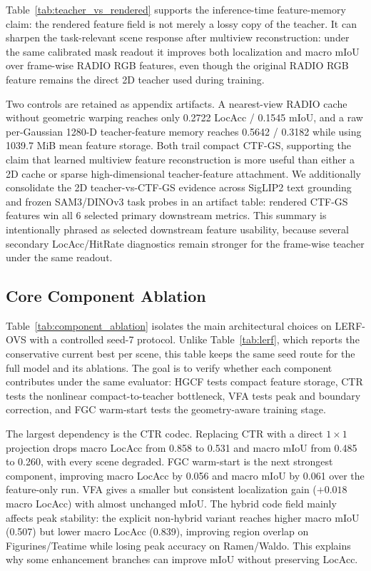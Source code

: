 \documentclass[10pt,twocolumn,letterpaper]{article}
\newcommand{\method}{CTF-GS}
\begin{document}
Table~\ref{tab:teacher_vs_rendered} supports the inference-time feature-memory
claim: the rendered feature field is not merely a lossy copy of the teacher. It
can sharpen the task-relevant scene response after multiview reconstruction:
under the same calibrated mask readout it improves both localization and macro
mIoU over frame-wise RADIO RGB features, even though the original RADIO RGB
feature remains the direct 2D teacher used during training.

Two controls are retained as appendix artifacts. A nearest-view RADIO cache
without geometric warping reaches only 0.2722 LocAcc / 0.1545 mIoU, and a raw
per-Gaussian 1280-D teacher-feature memory reaches 0.5642 / 0.3182 while using
1039.7 MiB mean feature storage. Both trail compact \method{}, supporting the
claim that learned multiview feature reconstruction is more useful than either
a 2D cache or sparse high-dimensional teacher-feature attachment.
We additionally consolidate the 2D teacher-vs-\method{} evidence across
SigLIP2 text grounding and frozen SAM3/DINOv3 task probes in an artifact table:
rendered \method{} features win all 6 selected primary downstream metrics.
This summary is intentionally phrased as selected downstream feature usability,
because several secondary LocAcc/HitRate diagnostics remain stronger for the
frame-wise teacher under the same readout.

\subsection{Core Component Ablation}





Table~\ref{tab:component_ablation} isolates the main architectural choices on
LERF-OVS with a controlled seed-7 protocol. Unlike Table~\ref{tab:lerf}, which
reports the conservative current best per scene, this table keeps the same seed
route for the full model and its ablations. The goal is to verify whether each
component contributes under the same evaluator: HGCF tests compact feature
storage, CTR tests the nonlinear compact-to-teacher bottleneck, VFA tests peak
and boundary correction, and FGC warm-start tests the geometry-aware training
stage.

The largest dependency is the CTR codec. Replacing CTR with a direct $1\times1$
projection drops macro LocAcc from 0.858 to 0.531 and macro mIoU from 0.485 to
0.260, with every scene degraded. FGC warm-start is the next strongest
component, improving macro LocAcc by 0.056 and macro mIoU by 0.061 over the
feature-only run. VFA gives a smaller but consistent localization gain
($+0.018$ macro LocAcc) with almost unchanged mIoU. The hybrid code field
mainly affects peak stability: the explicit non-hybrid variant reaches higher
macro mIoU (0.507) but lower macro LocAcc (0.839), improving region overlap on
Figurines/Teatime while losing peak accuracy on Ramen/Waldo. This explains why
some enhancement branches can improve mIoU without preserving LocAcc.
\end{document}

